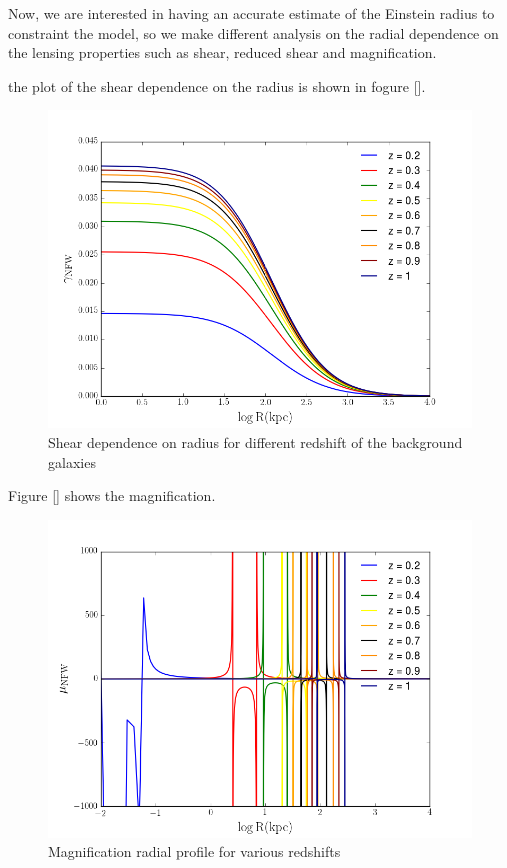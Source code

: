 Now, we are interested in having an accurate estimate of the Einstein radius to constraint the model, so we make different analysis on the radial dependence on the lensing properties such as shear, reduced shear and magnification.

the plot of the shear dependence on the radius is shown in fogure [].

\begin{figure}[H]
\centering
\includegraphics[width=12cm]{images/Shear_vs_rad.png}
\caption[Shear dependence on radius]{Shear dependence on radius for different redshift of the background galaxies}
\end{figure}

Figure [] shows the magnification.

\begin{figure}[H]
\centering
\includegraphics[width=12cm]{images/Magnification.png}
\caption[Magnification radial profile]{Magnification radial profile for various redshifts}
\end{figure}

